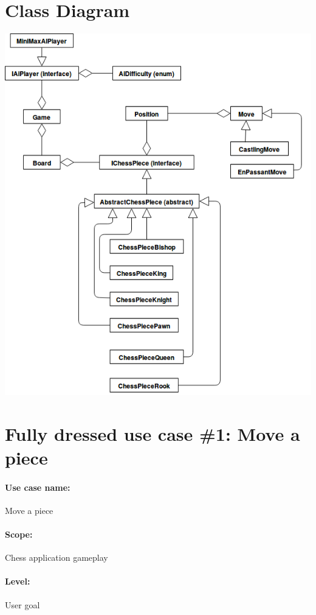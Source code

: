 \documentclass{article}
\begin{document}
\section*{Class Diagram}
\includegraphics[width=15cm]{classdiagram-v2}

\section*{Fully dressed use case \#1: Move a piece}

\paragraph{Use case name:} Move a piece

\paragraph{Scope:} Chess application gameplay

\paragraph{Level:} User goal
\end{document}

